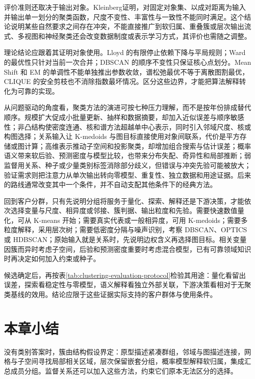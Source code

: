 评价准则还取决于输出对象。Kleinberg证明，对固定对象集、以成对距离为输入并输出单一划分的聚类函数，尺度不变性、丰富性与一致性不能同时满足。这个结论说明某些自然要求之间存在冲突，不能直接推广到软归属、重叠簇或层次输出流式、多视图和神经聚类还会改变数据制度或表示学习方式，其评价也需随之调整。

理论结论应跟着其证明对象使用。Lloyd 的有限停止依赖下降与平局规则；Ward 的最优性只针对当前一次合并；DBSCAN 的顺序不变性只保证核心点划分。Mean Shift 和 EM 的单调性不能单独推出参数收敛，谱松弛最优不等于离散图割最优，CLIQUE 的安全剪枝也不消除指数最坏情况。区分这些边界，才能把算法解释转化为可靠的实现。

从问题驱动的角度看，聚类方法的演进可按七种压力理解，而不是按年份排成替代顺序。规模扩大促成小批量更新、抽样和数据摘要，却加入近似误差与顺序敏感性；非凸结构使密度连通、核和谱方法超越单中心表示，同时引入邻域尺度、核或构图选择；关系输入让 K-medoids 与图目标直接使用对象间联系，代价是平方存储或图计算；高维表示推动子空间和投影聚类，却增加组合搜索与估计误差；概率语义带来软后验、预测密度与模型比较，也带来分布失配、奇异性和局部推断；弱监督用关系、种子或少量类别标签消除部分歧义，但错误与冲突先验可能被放大；验证需求则把注意力从单次输出转向零模型、重复性、独立数据和用途证据。后来的路线通常改变其中一个条件，并不自动支配其他条件下的经典方法。

回到客户分群，只有先说明分组将服务于量化、探索、解释还是下游决策，才能依次选择变量与尺度、相异度或邻接、簇判据、输出粒度和先验。需要快速数值量化，可从 K-means 开始；需要真实代表或一般相异度，可用 K-medoids；需要多粒度解释，采用层次树；需要低密度分隔与噪声识别，考察 DBSCAN、OPTICS 或 HDBSCAN；原始输入就是关系时，先说明边权含义再选择图目标。相关变量因簇而异时考虑子空间，后验和预测密度重要时考虑混合模型，已有可靠领域知识时再决定如何加入约束或种子。

候选确定后，再按表\ref{tab:clustering-evaluation-protocol}检验其用途：量化看留出误差，探索看稳定性与零模型，语义解释看独立外部关联，下游决策看相对于无聚类基线的效用。结论应限于这些证据实际支持的客户群体与使用条件。

\section{本章小结}
\label{sec:clustering-summary}

没有类别答案时，簇由结构假设界定：原型描述紧凑群组，邻域与图描述连接，网格与子空间寻找局部相关区域，层次保留嵌套分组，概率模型解释软归属，集成汇总成员分组。监督关系还可以加入这些方法，约束它们原本无法区分的选择。

